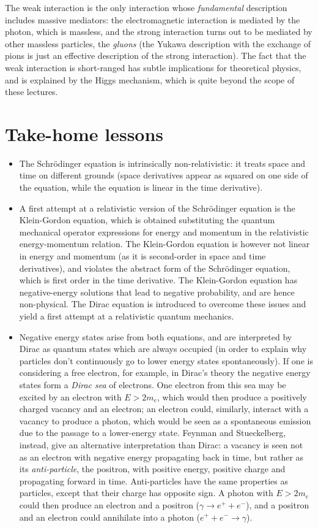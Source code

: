 The weak interaction is the only interaction whose \emph{fundamental} description includes massive mediators: the electromagnetic interaction is mediated by the photon, which is massless, and the strong interaction turns out to be mediated by other massless particles, the \emph{gluons} (the Yukawa description with the exchange of pions is just an effective description of the strong interaction). The fact that the weak interaction is short-ranged has subtle implications for theoretical physics, and is explained by the Higgs mechanism, which is quite beyond the scope of these lectures.

\section*{Take-home lessons}
\begin{itemize}
    \item The Schr\"odinger equation is intrinsically non-relativistic: it treats space and time on different grounds (space derivatives appear as squared on one side of the equation, while the equation is linear in the time derivative).
    \item A first attempt at a relativistic version of the Schr\"odinger equation is the Klein-Gordon equation, which is obtained substituting the quantum mechanical operator expressions for energy and momentum in the relativistic energy-momentum relation. The Klein-Gordon equation is however not linear in energy and momentum (as it is second-order in space and time derivatives), and violates the abstract form of the Schr\"odinger equation, which is first order in the time derivative. The Klein-Gordon equation has negative-energy solutions that lead to negative probability, and are hence non-physical. The Dirac equation is introduced to overcome these issues and yield a first attempt at a relativistic quantum mechanics.
    \item Negative energy states arise from both equations, and are interpreted by Dirac as quantum states which are always occupied (in order to explain why particles don't continuously go to lower energy states spontaneously). If one is considering a free electron, for example, in Dirac's theory the negative energy states form a \emph{Dirac sea} of electrons. One electron from this sea may be excited by an electron with $E>2m_e$, which would then produce a positively charged vacancy and an electron; an electron could, similarly, interact with a vacancy to produce a photon, which would be seen as a spontaneous emission due to the passage to a lower-energy state. Feynman and Stueckelberg, instead, give an alternative interpretation than Dirac: a vacancy is seen not as an electron with negative energy propagating back in time, but rather as its \emph{anti-particle}, the positron, with positive energy, positive charge and propagating forward in time. Anti-particles have the same properties as particles, except that their charge has opposite sign. A photon with $E>2m_e$ could then produce an electron and a positron ($\gamma\to e^++e^-$), and a positron and an electron could annihilate into a photon ($e^+ + e^- \to \gamma$).

\end{itemize}
